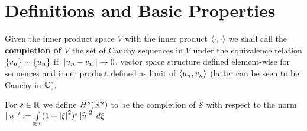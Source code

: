 \documentclass[10pt]{article} %
\def \hat {\widehat}
\begin{document}
\section{Definitions and Basic Properties}
\begin{mydef}Given the inner product space $V$ with the inner product $\left< \cdot,\cdot \right>$ we
	shall call the {\bf completion of $V$} the set of Cauchy sequences in $V$ under the equivalence relation
	$\left\{ v_n \right\}\sim\left\{ u_n \right\}$ if $\| u_n-v_n \|\to0$, vector space structure defined element-wise for sequences
	and inner product defined as limit of $\left< u_n,v_n \right>$ (latter can be seen to be Cauchy in $\mathbb{C}$).
\end{mydef}
\begin{mydef}For $s\in\mathbb{R}$ we define 
	$H^s(\mathbb{R}^n)$ to be the completion of $\mathcal{ S }$ with respect to the norm
	$\mynorm{u}':=\int_{\R^n}(1+\myabs{\xi}^2)^{s}\myabs{\hat{u}}^2\;d\xi$
	\end{mydef}
\end{document}
